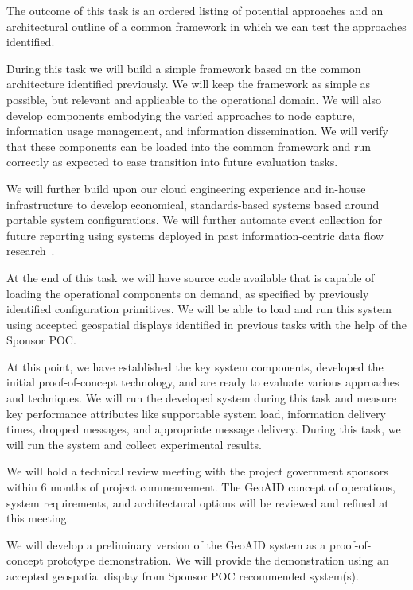 \documentclass{sbir}
\begin{document}
The outcome of this task is an ordered listing of potential approaches and an architectural outline of a common framework in which we can test the approaches identified.

During this task we will build a simple framework based on the common architecture identified previously. We will keep the framework as simple as possible, but relevant and applicable to the operational domain. We will also develop components embodying the varied approaches to node capture, information usage management, and information dissemination. We will verify that these components can be loaded into the common framework and run correctly as expected to ease transition into future evaluation tasks.

We will further build upon our cloud engineering experience and in-house infrastructure to develop economical, standards-based systems based around portable system configurations. We will further automate event collection for future reporting using systems deployed in past information-centric data flow research~\cite{LaHe:12b}.

At the end of this task we will have source code available that is capable of loading the operational components on demand, as specified by previously identified configuration primitives. We will be able to load and run this system using accepted geospatial displays identified in previous tasks with the help of the Sponsor POC.

At this point, we have established the key system components, developed the initial proof-of-concept technology, and are ready to evaluate various approaches and techniques. We will run the developed system during this task and measure key performance attributes like supportable system load, information delivery times, dropped messages, and appropriate message delivery. During this task, we will run the system and collect experimental results.

We will hold a technical review meeting with the project government sponsors within 6 months of project commencement. The GeoAID concept of operations, system requirements, and architectural options will be reviewed and refined at this meeting.

We will develop a preliminary version of the GeoAID system as a proof-of-concept prototype demonstration. We will provide the demonstration using an accepted geospatial display from Sponsor POC recommended system(s).
\end{document}
